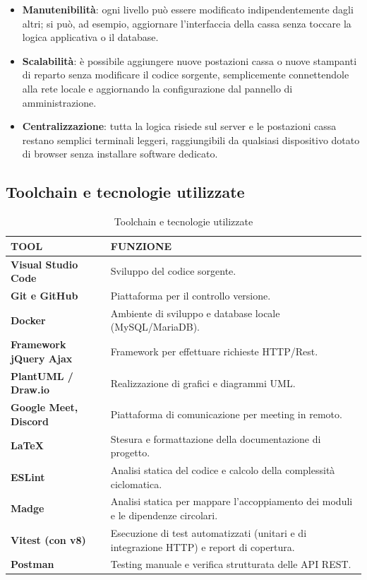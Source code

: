 \begin{itemize}
  \item \textbf{Manutenibilità}: ogni livello può essere modificato
        indipendentemente dagli altri; si può, ad esempio, aggiornare
        l'interfaccia della cassa senza toccare la logica applicativa o il
        database.
  \item \textbf{Scalabilità}: è possibile aggiungere nuove postazioni cassa o
        nuove stampanti di reparto senza modificare il codice sorgente,
        semplicemente connettendole alla rete locale e aggiornando la
        configurazione dal pannello di amministrazione.
  \item \textbf{Centralizzazione}: tutta la logica risiede sul server e le
        postazioni cassa restano semplici terminali leggeri, raggiungibili da
        qualsiasi dispositivo dotato di browser senza installare software
        dedicato.
\end{itemize}


\newpage
\subsection{Toolchain e tecnologie utilizzate}


\begin{table}[htbp]
\centering
\caption{Toolchain e tecnologie utilizzate}
\label{tab:toolchain}
\small
\begin{tabularx}{\textwidth}{l X}
\toprule
\textbf{TOOL} & \textbf{FUNZIONE} \\
\midrule
\textbf{Visual Studio Code} & Sviluppo del codice sorgente. \\
\addlinespace
\textbf{Git e GitHub} & Piattaforma per il controllo versione. \\
\addlinespace
\textbf{Docker} & Ambiente di sviluppo e database locale (MySQL/MariaDB). \\
\addlinespace
\textbf{Framework jQuery Ajax} & Framework per effettuare richieste HTTP/Rest. \\
\addlinespace
\textbf{PlantUML / Draw.io} & Realizzazione di grafici e diagrammi UML. \\
\addlinespace
\textbf{Google Meet, Discord} & Piattaforma di comunicazione per meeting in remoto. \\
\addlinespace
\textbf{\LaTeX} & Stesura e formattazione della documentazione di progetto. \\
\addlinespace
\textbf{ESLint} & Analisi statica del codice e calcolo della complessità ciclomatica. \\
\addlinespace
\textbf{Madge} & Analisi statica per mappare l'accoppiamento dei moduli e le dipendenze circolari. \\
\addlinespace
\textbf{Vitest (con v8)} & Esecuzione di test automatizzati (unitari e di integrazione HTTP) e report di copertura. \\
\addlinespace
\textbf{Postman} & Testing manuale e verifica strutturata delle API REST. \\
\bottomrule
\end{tabularx}
\end{table}

\newpage